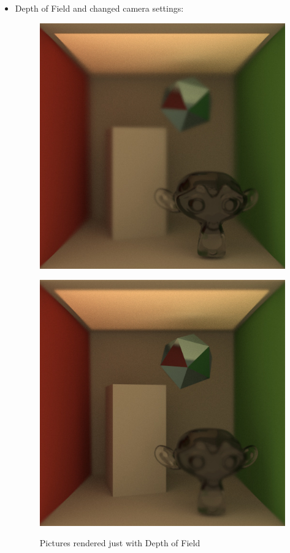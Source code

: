 \documentclass[11pt,a4paper]{article}
\begin{document}
\begin{itemize}
\item
Depth of Field and changed camera settings:
\begin{figure}[H]
\begin{center}
\begin{minipage}[b]{7.5 cm}
\includegraphics[scale=0.4]{images/DepthOfFieldFront1096spp}
\label{fig:3}
\end{minipage}
\begin{minipage}[b]{7.5 cm}
\includegraphics[scale=0.4]{images/DepthOfFieldBack1000spp}
\label{fig:4}
\end{minipage}
\caption[Pictures showing Depth of Field]{Pictures rendered just with Depth of Field}
\end{center}
\end{figure}


\end{itemize}
\end{document}
